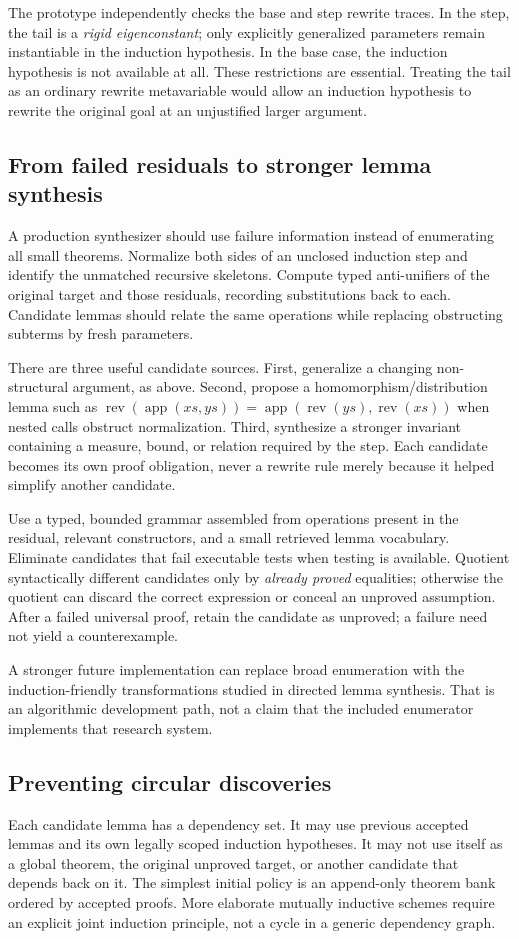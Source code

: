 \documentclass[11pt,a4paper]{article}
\newcommand{\app}{\operatorname{app}}
\newcommand{\rev}{\operatorname{rev}}
\begin{document}
The prototype independently checks the base and step rewrite traces. In the
step, the tail is a \emph{rigid eigenconstant}; only explicitly generalized
parameters remain instantiable in the induction hypothesis. In the base case,
the induction hypothesis is not available at all. These restrictions are
essential. Treating the tail as an ordinary rewrite metavariable would allow
an induction hypothesis to rewrite the original goal at an unjustified larger
argument.

\subsection{From failed residuals to stronger lemma synthesis}
A production synthesizer should use failure information instead of enumerating
all small theorems. Normalize both sides of an unclosed induction step and
identify the unmatched recursive skeletons. Compute typed anti-unifiers of the
original target and those residuals, recording substitutions back to each.
Candidate lemmas should relate the same operations while replacing obstructing
subterms by fresh parameters.

There are three useful candidate sources. First, generalize a changing
non-structural argument, as above. Second, propose a homomorphism/distribution
lemma such as $\rev(\app(xs,ys))=\app(\rev(ys),\rev(xs))$ when nested calls
obstruct normalization. Third, synthesize a stronger invariant containing a
measure, bound, or relation required by the step. Each candidate becomes its
own proof obligation, never a rewrite rule merely because it helped simplify
another candidate.

Use a typed, bounded grammar assembled from operations present in the residual,
relevant constructors, and a small retrieved lemma vocabulary. Eliminate
candidates that fail executable tests when testing is available. Quotient
syntactically different candidates only by \emph{already proved} equalities;
otherwise the quotient can discard the correct expression or conceal an
unproved assumption. After a failed universal proof, retain the candidate as
unproved; a failure need not yield a counterexample.

A stronger future implementation can replace broad enumeration with the
induction-friendly transformations studied in directed lemma synthesis. That
is an algorithmic development path, not a claim that the included enumerator
implements that research system.

\subsection{Preventing circular discoveries}
Each candidate lemma has a dependency set. It may use previous accepted lemmas
and its own legally scoped induction hypotheses. It may not use itself as a
global theorem, the original unproved target, or another candidate that depends
back on it. The simplest initial policy is an append-only theorem bank ordered
by accepted proofs. More elaborate mutually inductive schemes require an
explicit joint induction principle, not a cycle in a generic dependency graph.
\end{document}

